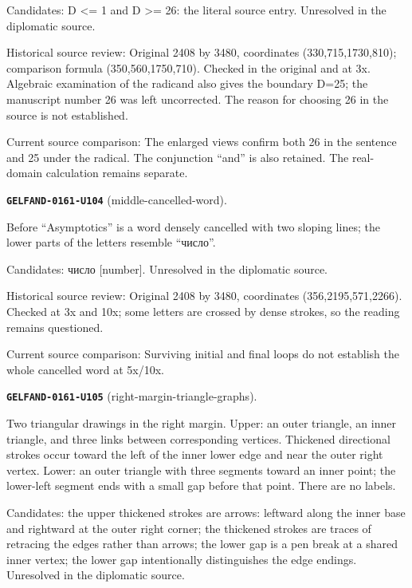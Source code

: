 Candidates: D <= 1 and D >= 26: the literal source entry. Unresolved in the diplomatic source.\par
Historical source review: Original 2408 by 3480, coordinates (330,715,1730,810); comparison formula (350,560,1750,710). Checked in the original and at 3x. Algebraic examination of the radicand also gives the boundary D=25; the manuscript number 26 was left uncorrected. The reason for choosing 26 in the source is not established.\par
Current source comparison: The enlarged views confirm both 26 in the sentence and 25 under the radical. The conjunction “and” is also retained. The real-domain calculation remains separate.\par\medskip
\par\noindent\leavevmode{}\label{GELFAND-0161-U104}\label{GELFAND-P001487:middle-cancelled-word}\textbf{\texttt{GELFAND-0161-U104}} (middle-cancelled-word).\nopagebreak[4]\par
Before “Asymptotics” is a word densely cancelled with two sloping lines; the lower parts of the letters resemble “число”.\par
Candidates: число [number]. Unresolved in the diplomatic source.\par
Historical source review: Original 2408 by 3480, coordinates (356,2195,571,2266). Checked at 3x and 10x; some letters are crossed by dense strokes, so the reading remains questioned.\par
Current source comparison: Surviving initial and final loops do not establish the whole cancelled word at 5x/10x.\par\medskip
\par\noindent\leavevmode{}\label{GELFAND-0161-U105}\label{GELFAND-P001487:right-margin-triangle-graphs}\textbf{\texttt{GELFAND-0161-U105}} (right-margin-triangle-graphs).\nopagebreak[4]\par
Two triangular drawings in the right margin. Upper: an outer triangle, an inner triangle, and three links between corresponding vertices. Thickened directional strokes occur toward the left of the inner lower edge and near the outer right vertex. Lower: an outer triangle with three segments toward an inner point; the lower-left segment ends with a small gap before that point. There are no labels.\par
Candidates: the upper thickened strokes are arrows: leftward along the inner base and rightward at the outer right corner; the thickened strokes are traces of retracing the edges rather than arrows; the lower gap is a pen break at a shared inner vertex; the lower gap intentionally distinguishes the edge endings. Unresolved in the diplomatic source.\par
